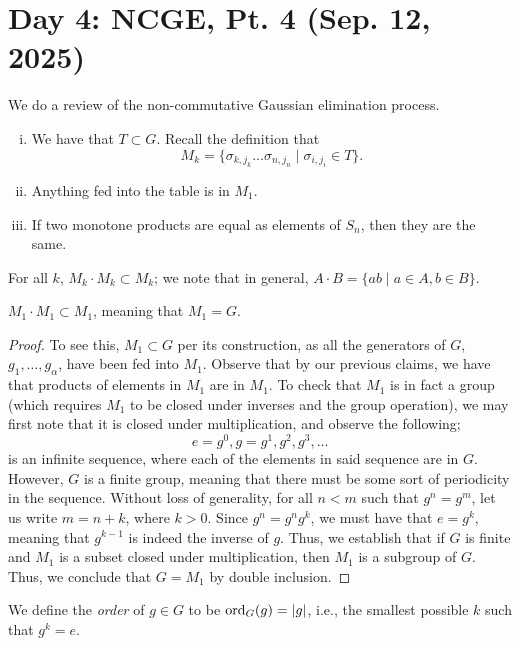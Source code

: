 \section{Day 4: NCGE, Pt. 4 (Sep. 12, 2025)}
We do a review of the non-commutative Gaussian elimination process.
\begin{enumerate}[(i)]
    \item We have that $T \subset G$. Recall the definition that
    \[ M_k = \{ \sigma_{k, j_k} \dots \sigma_{n, j_n} \mid \sigma_{i, j_i} \in T \}. \]
    \item Anything fed into the table is in $M_1$.
    \item If two monotone products are equal as elements of $S_n$, then they are the same.
\end{enumerate}
\begin{theorem}
    For all $k$, $M_k \cdot M_k \subset M_k$; we note that in general, $A \cdot B = \{ab \mid a \in A, b \in B\}$.
\end{theorem}
\begin{corollary}
    $M_1 \cdot M_1 \subset M_1$, meaning that $M_1 = G$.
\end{corollary}
\begin{proof}
    To see this, $M_1 \subset G$ per its construction, as all the generators of $G$, $g_1, \dots, g_\alpha$, have been fed into $M_1$. Observe that by our previous claims, we have that products of elements in $M_1$ are in $M_1$. To check that $M_1$ is in fact a group (which requires $M_1$ to be closed under inverses and the group operation), we may first note that it is closed under multiplication, and observe the following;
    \[ e = g^0, g = g^1, g^2, g^3, \dots \]
    is an infinite sequence, where each of the elements in said sequence are in $G$. However, $G$ is a finite group, meaning that there must be some sort of periodicity in the sequence. Without loss of generality, for all $n < m$ such that $g^n = g^m$, let us write $m = n + k$, where $k > 0$. Since $g^n = g^n g^k$, we must have that $e = g^k$, meaning that $g^{k-1}$ is indeed the inverse of $g$. Thus, we establish that if $G$ is finite and $M_1$ is a subset closed under multiplication, then $M_1$ is a subgroup of $G$. Thus, we conclude that $G = M_1$ by double inclusion.
\end{proof}
\begin{definition}
    We define the \textit{order} of $g \in G$ to be $\operatorname{ord}_G(g) = \left\lvert g \right\rvert$, i.e., the smallest possible $k$ such that $g^k = e$.
\end{definition}

